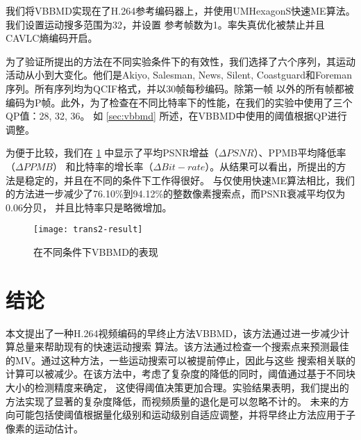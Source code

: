我们将VBBMD实现在了H.264参考编码器上，并使用UMHexagonS快速ME算法。我们设置运动搜多范围为32，并设置
参考帧数为1。率失真优化被禁止并且CAVLC熵编码开启。

为了验证所提出的方法在不同实验条件下的有效性，我们选择了六个序列，其运动活动从小到大变化。他们是Akiyo, 
Salesman, News, Silent, Coastguard和Foreman序列。所有序列均为QCIF格式，并以30帧每秒编码。除第一帧
以外的所有帧都被编码为P帧。此外，为了检查在不同比特率下的性能，在我们的实验中使用了三个QP值：28, 32, 36。
如 \ref{sec:vbbmd} 所述，在VBBMD中使用的阈值根据QP进行调整。

为便于比较，我们在 \ref{fig:trans2-result} 中显示了平均PSNR增益（$\Delta PSNR$）、PPMB平均降低率（$\Delta PPMB$）
和比特率的增长率（$\Delta Bit-rate$）。从结果可以看出，所提出的方法是稳定的，并且在不同的条件下工作得很好。
与仅使用快速ME算法相比，我们的方法进一步减少了76.10\%到94.12\%的整数像素搜索点，而PSNR衰减平均仅为0.06分贝，
并且比特率只是略微增加。

\begin{figure}[H] %
  \centering
  \texttt{[image: trans2-result]}
  \caption{在不同条件下VBBMD的表现}
  \label{fig:trans2-result}
\end{figure}

\section{结论}
\label{sec:app2-conclusion}

本文提出了一种H.264视频编码的早终止方法VBBMD，该方法通过进一步减少计算总量来帮助现有的快速运动搜索
算法。该方法通过检查一个搜索点来预测最佳的MV。通过这种方法，一些运动搜索可以被提前停止，因此与这些
搜索相关联的计算可以被减少。在该方法中，考虑了复杂度的降低的同时，阈值通过基于不同块大小的检测精度来确定，
这使得阈值决策更加合理。实验结果表明，我们提出的方法实现了显著的复杂度降低，而视频质量的退化是可以忽略不计的。
未来的方向可能包括使阈值根据量化级别和运动级别自适应调整，并将早终止方法应用于子像素的运动估计。
